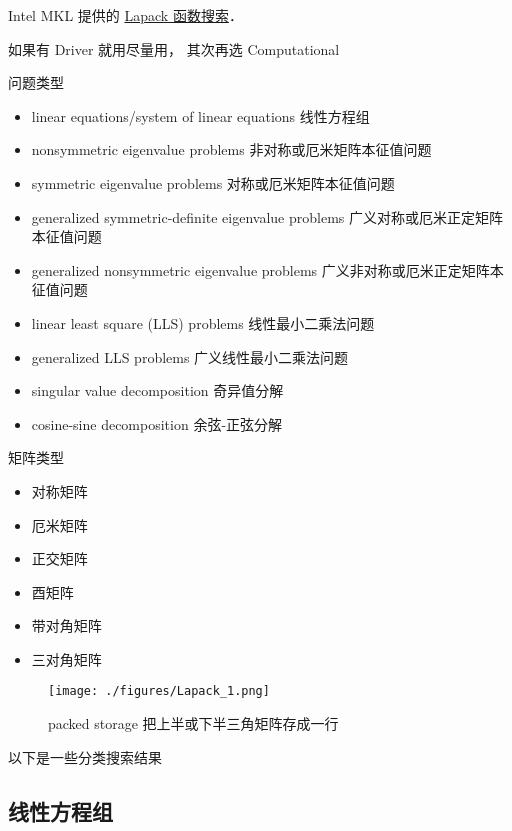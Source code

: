 
\begin{issues}
\issueDraft
\end{issues}


Intel MKL 提供的 \href{https://www.intel.com/content/www/us/en/developer/tools/oneapi/onemkl-function-finding-advisor.html}{Lapack 函数搜索}．

如果有 Driver 就用尽量用， 其次再选 Computational

问题类型
\begin{itemize}
\item linear equations/system of linear equations 线性方程组
\item nonsymmetric eigenvalue problems 非对称或厄米矩阵本征值问题
\item symmetric eigenvalue problems 对称或厄米矩阵本征值问题
\item generalized symmetric-definite eigenvalue problems 广义对称或厄米正定矩阵本征值问题
\item generalized nonsymmetric eigenvalue problems 广义非对称或厄米正定矩阵本征值问题
\item linear least square (LLS) problems 线性最小二乘法问题
\item generalized LLS problems 广义线性最小二乘法问题
\item singular value decomposition 奇异值分解
\item cosine-sine decomposition 余弦-正弦分解
\end{itemize}

矩阵类型
\begin{itemize}
\item 对称矩阵
\item 厄米矩阵
\item 正交矩阵
\item 酉矩阵
\item 带对角矩阵
\item 三对角矩阵
\end{itemize}

\begin{figure}[ht]
\centering
\texttt{[image: ./figures/Lapack\_1.png]}
\caption{packed storage 把上半或下半三角矩阵存成一行} \label{Lapack_fig1}
\end{figure}

以下是一些分类搜索结果

\subsection{线性方程组}
